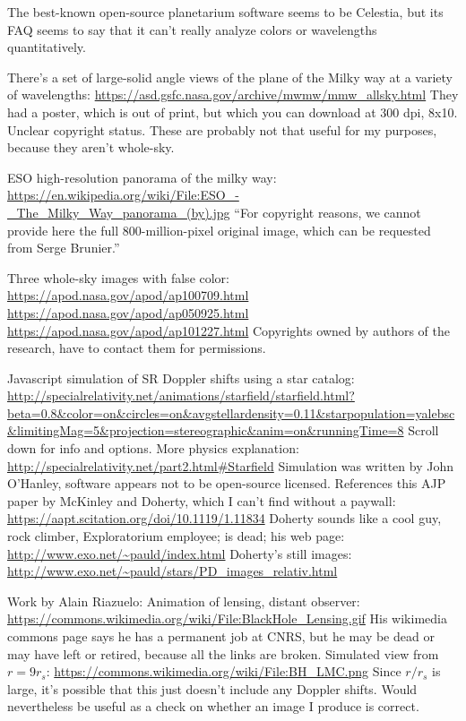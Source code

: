 \documentclass{article}
\begin{document}
The best-known open-source planetarium software seems to be Celestia, but its FAQ
seems to say that it can't really analyze colors or wavelengths quantitatively.

There's a set of large-solid angle views of the plane of the Milky way at a variety
of wavelengths: \url{https://asd.gsfc.nasa.gov/archive/mwmw/mmw_allsky.html} They had
a poster, which is out of print, but which you can download at 300 dpi, 8x10. Unclear
copyright status. These are probably not that useful for my purposes, because they
aren't whole-sky.

ESO high-resolution panorama of the milky way:
\url{https://en.wikipedia.org/wiki/File:ESO_-_The_Milky_Way_panorama_(by).jpg}
``For copyright reasons, we cannot provide here the full 800-million-pixel original image, which can be requested from Serge Brunier.''

Three whole-sky images with false color:
\url{https://apod.nasa.gov/apod/ap100709.html}
\url{https://apod.nasa.gov/apod/ap050925.html}
\url{https://apod.nasa.gov/apod/ap101227.html}
Copyrights owned by authors of the research, have to contact them for permissions.

Javascript simulation of SR Doppler shifts using a star catalog:
\url{http://specialrelativity.net/animations/starfield/starfield.html?beta=0.8&color=on&circles=on&avgstellardensity=0.11&starpopulation=yalebsc&limitingMag=5&projection=stereographic&anim=on&runningTime=8}
Scroll down for info and options.
More physics explanation: \url{http://specialrelativity.net/part2.html#Starfield}
Simulation was written by John O'Hanley, software appears not to be open-source licensed.
References this AJP paper by McKinley and Doherty, which I can't find without a paywall:
\url{https://aapt.scitation.org/doi/10.1119/1.11834} Doherty sounds like a cool guy, rock
climber, Exploratorium employee; is dead; his web page: \url{http://www.exo.net/~pauld/index.html}
Doherty's still images: \url{http://www.exo.net/~pauld/stars/PD_images_relativ.html}

Work by Alain Riazuelo: Animation of lensing,
distant observer: \url{https://commons.wikimedia.org/wiki/File:BlackHole_Lensing.gif}
His wikimedia commons page says he has a permanent job at CNRS, but he may be dead or
may have left or retired, because all the links are broken.
Simulated view from $r=9r_s$: \url{https://commons.wikimedia.org/wiki/File:BH_LMC.png}
Since $r/r_s$ is large, it's possible that this just doesn't include any Doppler shifts.
Would nevertheless be useful as a check on whether an image I produce is correct.
\end{document}
